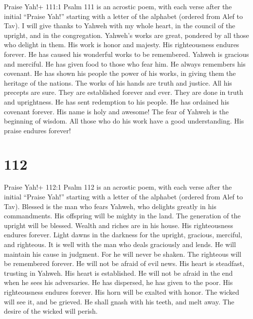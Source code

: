  Praise Yah!+ 111:1 Psalm 111 is an acrostic poem, with each
verse after the initial ``Praise Yah!'' starting with a letter of the
alphabet (ordered from Alef to Tav). I will give thanks to Yahweh with
my whole heart, in the council of the upright, and in the congregation.
 Yahweh's works are great, pondered by all those who delight
in them.  His work is honor and majesty. His righteousness
endures forever.  He has caused his wonderful works to be
remembered. Yahweh is gracious and merciful.  He has given
food to those who fear him. He always remembers his covenant.
 He has shown his people the power of his works, in giving
them the heritage of the nations.  The works of his hands
are truth and justice. All his precepts are sure.  They are
established forever and ever. They are done in truth and uprightness.
 He has sent redemption to his people. He has ordained his
covenant forever. His name is holy and awesome!  The fear
of Yahweh is the beginning of wisdom. All those who do his work have a
good understanding. His praise endures forever!

\hypertarget{section-102}{%
\section{112}\label{section-102}}

 Praise Yah!+ 112:1 Psalm 112 is an acrostic poem, with each
verse after the initial ``Praise Yah!'' starting with a letter of the
alphabet (ordered from Alef to Tav). Blessed is the man who fears
Yahweh, who delights greatly in his commandments.  His
offspring will be mighty in the land. The generation of the upright will
be blessed.  Wealth and riches are in his house. His
righteousness endures forever.  Light dawns in the darkness
for the upright, gracious, merciful, and righteous.  It is
well with the man who deals graciously and lends. He will maintain his
cause in judgment.  For he will never be shaken. The
righteous will be remembered forever.  He will not be afraid
of evil news. His heart is steadfast, trusting in Yahweh. 
His heart is established. He will not be afraid in the end when he sees
his adversaries.  He has dispersed, he has given to the
poor. His righteousness endures forever. His horn will be exalted with
honor.  The wicked will see it, and be grieved. He shall
gnash with his teeth, and melt away. The desire of the wicked will
perish.

